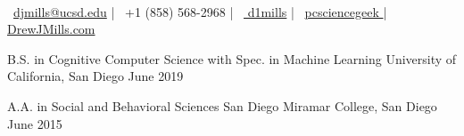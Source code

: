 \documentclass[]{awesome-cv}
\begin{document}
\begin{center}
	  \\
	\vspace{2mm}
	{\faEnvelopeO\ \href{mailto:djmills@ucsd.edu}{djmills@ucsd.edu}} | {\faPhoneSquare\ +1 (858) 568-2968} |  {\faLinkedinSquare\ \href{https://linkedin.com/in/d1mills/}{ d1mills}} | {\faGithub\ \href{https://github.com/pcsciencegeek}{pcsciencegeek }} | {\faGlobe \href{http://drewmills.co.uk/}{ DrewJMills.com}}
\end{center}
\begin{cventries}
	\cventry
	{B.S. in Cognitive Computer Science with Spec. in Machine Learning}
	{University of California, San Diego} 
	{}
	{June 2019}
	{}
\end{cventries}

\vspace{-5mm}

\begin{cventries}
	\cventry
	{A.A. in Social and Behavioral Sciences}
	{San Diego Miramar College, San Diego} 
	{}
	{June 2015}
	{}
\end{cventries}
\vspace{-5mm}
\end{document}
